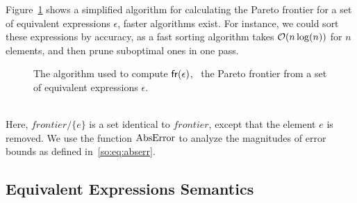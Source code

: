 Figure~\ref{so:alg:pareto} shows a simplified algorithm for calculating
the Pareto frontier for a set of equivalent expressions $\epsilon$, faster
algorithms exist.  For instance, we could sort these expressions by accuracy,
as a fast sorting algorithm takes $\operatorname{\mathcal{O}}(n\log(n))$ for $n$ elements, and then
prune suboptimal ones in one pass.
\begin{figure}[ht]
    \centering
    \begin{algorithmic}
        \singlespacing%
                    \EndIf{}
                \EndFor{}
            \EndFor{}
        \EndFunction%
    \end{algorithmic}
    \caption{%
        The algorithm used to compute $\operatorname{\mathsf{fr}}(\epsilon)$, \ie~the Pareto
        frontier from a set of equivalent expressions $\epsilon$.
    }\label{so:alg:pareto}
\end{figure} \\
Here, $\mathit{frontier} / \{ e \}$ is a set identical to $\mathit{frontier}$,
except that the element $e$ is removed.  We use the function $\operatorname{\mathrm{AbsError}}$ to
analyze the magnitudes of error bounds as defined in~\eqref{so:eq:abserr}.


\subsection{Equivalent Expressions Semantics}
\label{so:sub:equivalent_semantics}


